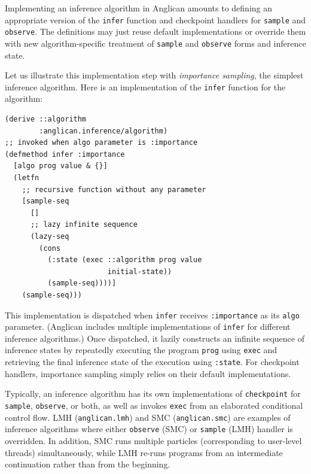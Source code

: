 \documentclass[preprint]{sigplanconf}
\begin{document}
Implementing an inference algorithm in Anglican amounts
to defining an appropriate version of the \texttt{infer} function and 
checkpoint handlers for \texttt{sample} and \texttt{observe}.
The definitions may just reuse default implementations or override them
with new algorithm-specific treatment of \texttt{sample} and \texttt{observe} forms
and inference state.

Let us illustrate this implementation step with
\textit{importance sampling},
the simplest inference algorithm.
Here is an implementation of the \texttt{infer} function for the algorithm:
\begin{lstlisting}[style=default]
(derive ::algorithm
        :anglican.inference/algorithm)
;; invoked when algo parameter is :importance
(defmethod infer :importance 
  [algo prog value & {}]
  (letfn
    ;; recursive function without any parameter
    [sample-seq 
      []
      ;; lazy infinite sequence 
      (lazy-seq
        (cons
          (:state (exec ::algorithm prog value
                        initial-state))
          (sample-seq))))]
    (sample-seq)))
\end{lstlisting}
This implementation is dispatched 
when \texttt{infer} receives \texttt{:importance} as its \texttt{algo} 
parameter. (Anglican includes multiple implementations of \texttt{infer}
for different inference algorithms.) Once dispatched, it lazily 
constructs an infinite sequence of inference states by repeatedly 
executing the program \texttt{prog} using \texttt{exec}
and retrieving the final inference state of the execution 
using \texttt{:state}. For checkpoint handlers, importance sampling simply
relies on their default implementations.

Typically, an inference
algorithm has its own implementations of
\texttt{checkpoint} for \texttt{sample}, \texttt{observe}, or
both, as well as invokes \texttt{exec} from an elaborated
conditional control flow. LMH (\texttt{anglican.lmh}) and SMC
(\texttt{anglican.smc}) are examples of inference algorithms
where either \texttt{observe} (SMC) or \texttt{sample} (LMH)
handler is overridden. In addition, SMC runs multiple particles
(corresponding to user-level threads) simultaneously, while LMH re-runs
programs from an intermediate continuation rather than from the
beginning.
\end{document}
